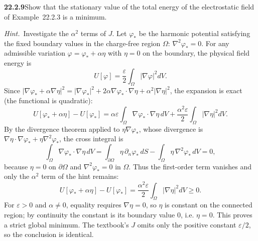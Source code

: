 \par\bigskip
\noindent\textbf{22.2.9}\quad Show that the stationary value of
the total energy of the electrostatic field of Example~22.2.3 is
a minimum.
\par\emph{Hint.}~Investigate the $\alpha^{2}$ terms of $J$.
\solution
Let $\varphi_*$ be the harmonic potential satisfying the fixed
boundary values in the charge-free region $\Omega$:
$\nabla^2\varphi_*=0$. For any admissible variation
$\varphi=\varphi_*+\alpha\eta$ with $\eta=0$ on the boundary,
the physical field energy is
\[
U[\varphi]=\frac\varepsilon2\int_\Omega|\nabla\varphi|^2dV.
\]
Since
$|\nabla\varphi_*+\alpha\nabla\eta|^2=|\nabla\varphi_*|^2
+2\alpha\nabla\varphi_*\cdot\nabla\eta+\alpha^2|\nabla\eta|^2$,
the expansion is exact (the functional is quadratic):
\[
U[\varphi_*+\alpha\eta]-U[\varphi_*]
=\alpha\varepsilon\int_\Omega\nabla\varphi_*\cdot\nabla\eta\,dV
+\frac{\alpha^2\varepsilon}{2}\int_\Omega|\nabla\eta|^2dV.
\]
By the divergence theorem applied to $\eta\nabla\varphi_*$, whose
divergence is $\nabla\eta\cdot\nabla\varphi_*+\eta\nabla^2\varphi_*$,
the cross integral is
\[
\int_\Omega\nabla\varphi_*\cdot\nabla\eta\,dV
=\int_{\partial\Omega}\eta\,\partial_n\varphi_*\,dS
-\int_\Omega\eta\,\nabla^2\varphi_*\,dV=0,
\]
because $\eta=0$ on $\partial\Omega$ and $\nabla^2\varphi_*=0$ in
$\Omega$. Thus the first-order term vanishes and only the $\alpha^2$
term of the hint remains:
\[
\boxed{U[\varphi_*+\alpha\eta]-U[\varphi_*]
=\frac{\alpha^2\varepsilon}{2}\int_\Omega|\nabla\eta|^2dV\ge0}.
\]
For $\varepsilon>0$ and $\alpha\ne0$, equality requires
$\nabla\eta=0$, so $\eta$ is constant on the connected region; by
continuity the constant is its boundary value $0$, i.e. $\eta=0$.
This proves a strict global minimum. The textbook's $J$ omits only the
positive constant $\varepsilon/2$, so the conclusion is identical.


